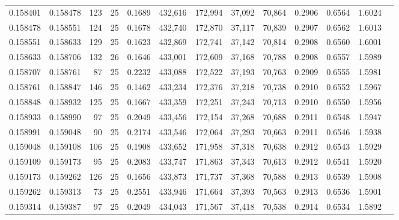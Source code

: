 \begin{tabular}{rrrrrrrrrrrrr}
0.158401 & 0.158478 &   123 &  25 &                                     0.1689 & 432,616 & 172,994 &  37,092 &  70,864 & 0.2906 & 0.6564 & 1.6024 \\
0.158478 & 0.158551 &   124 &  25 &                                     0.1678 & 432,740 & 172,870 &  37,117 &  70,839 & 0.2907 & 0.6562 & 1.6013 \\
0.158551 & 0.158633 &   129 &  25 &                                     0.1623 & 432,869 & 172,741 &  37,142 &  70,814 & 0.2908 & 0.6560 & 1.6001 \\
0.158633 & 0.158706 &   132 &  26 &                                     0.1646 & 433,001 & 172,609 &  37,168 &  70,788 & 0.2908 & 0.6557 & 1.5989 \\
0.158707 & 0.158761 &    87 &  25 &                                     0.2232 & 433,088 & 172,522 &  37,193 &  70,763 & 0.2909 & 0.6555 & 1.5981 \\
0.158761 & 0.158847 &   146 &  25 &                                     0.1462 & 433,234 & 172,376 &  37,218 &  70,738 & 0.2910 & 0.6552 & 1.5967 \\
0.158848 & 0.158932 &   125 &  25 &                                     0.1667 & 433,359 & 172,251 &  37,243 &  70,713 & 0.2910 & 0.6550 & 1.5956 \\
0.158933 & 0.158990 &    97 &  25 &                                     0.2049 & 433,456 & 172,154 &  37,268 &  70,688 & 0.2911 & 0.6548 & 1.5947 \\
0.158991 & 0.159048 &    90 &  25 &                                     0.2174 & 433,546 & 172,064 &  37,293 &  70,663 & 0.2911 & 0.6546 & 1.5938 \\
0.159048 & 0.159108 &   106 &  25 &                                     0.1908 & 433,652 & 171,958 &  37,318 &  70,638 & 0.2912 & 0.6543 & 1.5929 \\
0.159109 & 0.159173 &    95 &  25 &                                     0.2083 & 433,747 & 171,863 &  37,343 &  70,613 & 0.2912 & 0.6541 & 1.5920 \\
0.159173 & 0.159262 &   126 &  25 &                                     0.1656 & 433,873 & 171,737 &  37,368 &  70,588 & 0.2913 & 0.6539 & 1.5908 \\
0.159262 & 0.159313 &    73 &  25 &                                     0.2551 & 433,946 & 171,664 &  37,393 &  70,563 & 0.2913 & 0.6536 & 1.5901 \\
0.159314 & 0.159387 &    97 &  25 &                                     0.2049 & 434,043 & 171,567 &  37,418 &  70,538 & 0.2914 & 0.6534 & 1.5892 \\

\end{tabular}
